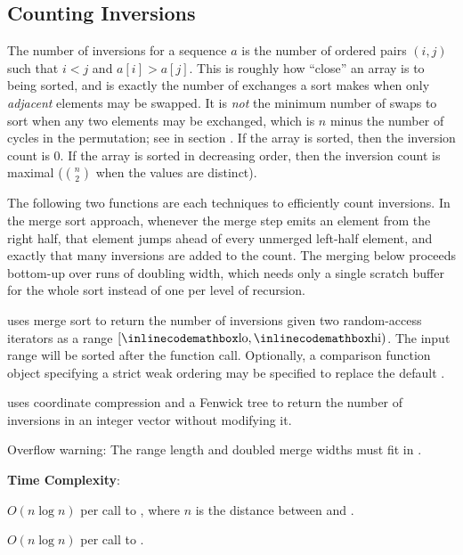 \subsection{Counting Inversions}
\label{sec:1.1.5}
The number of inversions for a sequence $a$ is the number of ordered pairs $(i, j)$ such that $i < j$ and $a[i] > a[j]$. This is roughly how ``close'' an array is to being sorted, and is exactly the number of exchanges a sort makes when only \textit{adjacent} elements may be swapped. It is \textit{not} the minimum number of swaps to sort when any two elements may be exchanged, which is $n$ minus the number of cycles in the permutation; see  in section . If the array is sorted, then the inversion count is $0$. If the array is sorted in decreasing order, then the inversion count is maximal ($\binom{n}{2}$ when the values are distinct).

The following two functions are each techniques to efficiently count inversions. In the merge sort approach, whenever the merge step emits an element from the right half, that element jumps ahead of every unmerged left-half element, and exactly that many inversions are added to the count. The merging below proceeds bottom-up over runs of doubling width, which needs only a single scratch buffer for the whole sort instead of one per level of recursion.

\begin{compactitem}
  \item {} uses merge sort to return the number of inversions given two random-access iterators as a range $[{\inlinecodemath{lo}}, {\inlinecodemath{hi}})$. The input range will be sorted after the function call. Optionally, a comparison function object specifying a strict weak ordering may be specified to replace the default .
  \item {} uses coordinate compression and a Fenwick tree to return the number of inversions in an integer vector without modifying it.
\end{compactitem}

Overflow warning: The range length and doubled merge widths must fit in .

\textbf{Time Complexity}:
\begin{compactitem}
  \item $O(n \log n)$ per call to , where $n$ is the distance between  and .
  \item $O(n \log n)$ per call to .
\end{compactitem}

